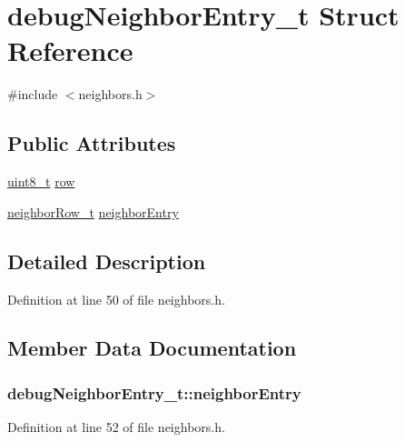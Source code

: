 \hypertarget{structdebug_neighbor_entry__t}{}\section{debug\+Neighbor\+Entry\+\_\+t Struct Reference}
\label{structdebug_neighbor_entry__t}


{\ttfamily \#include $<$neighbors.\+h$>$}

\subsection*{Public Attributes}
\begin{DoxyCompactItemize}
\item 
\hyperlink{_p_e___types_8h_aba7bc1797add20fe3efdf37ced1182c5}{uint8\+\_\+t} \hyperlink{structdebug_neighbor_entry__t_ab393c4e54604336bb6f9d4da65aabf62}{row}
\item 
\hyperlink{structneighbor_row__t}{neighbor\+Row\+\_\+t} \hyperlink{structdebug_neighbor_entry__t_af6bfb8ef15959f394554e668c823138f}{neighbor\+Entry}
\end{DoxyCompactItemize}


\subsection{Detailed Description}


Definition at line 50 of file neighbors.\+h.



\subsection{Member Data Documentation}
\subsubsection[{\texorpdfstring{neighbor\+Entry}{neighborEntry}}]{ debug\+Neighbor\+Entry\+\_\+t\+::neighbor\+Entry}\hypertarget{structdebug_neighbor_entry__t_af6bfb8ef15959f394554e668c823138f}{}\label{structdebug_neighbor_entry__t_af6bfb8ef15959f394554e668c823138f}


Definition at line 52 of file neighbors.\+h.

